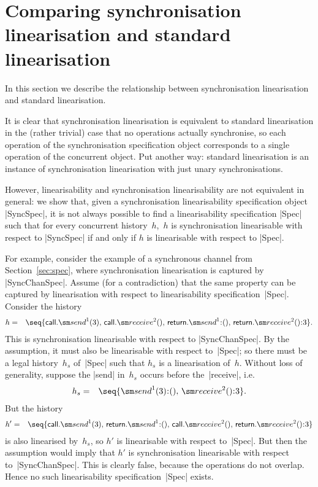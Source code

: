 \section{Comparing synchronisation linearisation and standard linearisation}
\label{sec:relating}

In this section we describe the relationship between synchronisation
linearisation and standard linearisation.

It is clear that synchronisation linearisation is equivalent to standard
linearisation in the (rather trivial) case that no operations actually
synchronise, so each operation of the synchronisation specification object
corresponds to a single operation of the concurrent object.  Put another way:
standard linearisation is an instance of synchronisation linearisation with
just unary synchronisations.

However, linearisability and synchronisation linearisability are not
equivalent in general: we show that, given a synchronisation linearisability
specification object |SyncSpec|, it is not always possible to find a
linearisability specification |Spec| such that for every concurrent
history~$h$,\, $h$ is synchronisation linearisable with respect to |SyncSpec|
if and only if $h$ is linearisable with respect to |Spec|.

For example, consider the example of a synchronous channel from
Section~\ref{sec:spec}, where synchronisation linearisation is captured by
|SyncChanSpec|.  Assume (for a contradiction) that the same property can be
captured by linearisation with respect to linearisability
specification~|Spec|.  Consider the history
\begin{eqnarray*}
h & = & \seq{ 
  \call.\send^1(3),\, \call.\receive^2(),\, 
  \return.\send^1\::(),\, \return.\receive^2()\::3 }.
\end{eqnarray*}
%
This is synchronisation linearisable with respect to |SyncChanSpec|.  By the
assumption, it must also be linearisable with respect to~|Spec|; so there must
be a legal history~$h_s$ of~|Spec| such that $h_s$ is a linearisation of~$h$.
Without loss of generality, suppose the |send| in~$h_s$ occurs before
the~|receive|, i.e.
\begin{eqnarray*}
h_s & = & \seq{ \send^1(3)\::(),\, \receive^2()\::3 }.
\end{eqnarray*}
%
But the history
%
\begin{eqnarray*}
h' & = & \seq{ 
  \call.\send^1(3),\, \return.\send^1\::(),\, 
  \call.\receive^2(),\, \return.\receive^2()\::3 }
\end{eqnarray*}
%
is also linearised by~$h_s$, so $h'$ is linearisable with respect to~|Spec|.
But then the assumption would imply that $h'$ is synchronisation linearisable
with respect to~|SyncChanSpec|.  This is clearly false, because the operations
do not overlap.  Hence no such linearisability specification~|Spec| exists.


